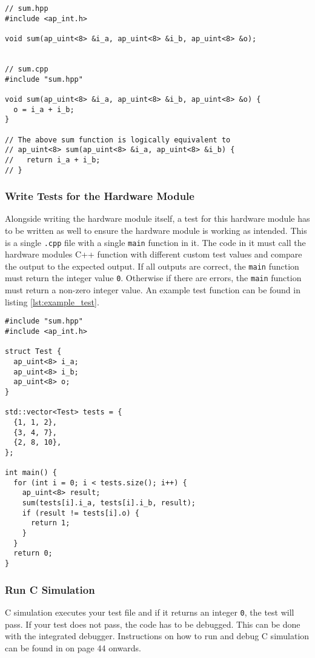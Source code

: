 \begin{lstlisting}[caption=Example Hardware Module,style=lststyle,label=lst:example_hardware_module]
// sum.hpp
#include <ap_int.h>

void sum(ap_uint<8> &i_a, ap_uint<8> &i_b, ap_uint<8> &o);


// sum.cpp
#include "sum.hpp"

void sum(ap_uint<8> &i_a, ap_uint<8> &i_b, ap_uint<8> &o) {
  o = i_a + i_b;
}

// The above sum function is logically equivalent to
// ap_uint<8> sum(ap_uint<8> &i_a, ap_uint<8> &i_b) {
//   return i_a + i_b;
// }
\end{lstlisting}

\subsubsection{Write Tests for the Hardware Module}
Alongside writing the hardware module itself, a test for this hardware module has to be written as well to ensure the hardware module is working as intended. This is a single \texttt{.cpp} file with a single \texttt{main} function in it. The code in it must call the hardware modules C++ function with different custom test values and compare the output to the expected output. If all outputs are correct, the \texttt{main} function must return the integer value \texttt{0}. Otherwise if there are errors, the \texttt{main} function must return a non-zero integer value. An example test function can be found in listing \ref{lst:example_test}.

\begin{lstlisting}[caption=Example Test,style=lststyle,label=lst:example_test]
#include "sum.hpp"
#include <ap_int.h>

struct Test {
  ap_uint<8> i_a;
  ap_uint<8> i_b;
  ap_uint<8> o;
}

std::vector<Test> tests = {
  {1, 1, 2},
  {3, 4, 7},
  {2, 8, 10},
};

int main() {
  for (int i = 0; i < tests.size(); i++) {
    ap_uint<8> result;
    sum(tests[i].i_a, tests[i].i_b, result);
    if (result != tests[i].o) {
      return 1;
    }
  }
  return 0;
}
\end{lstlisting}

\subsubsection{Run C Simulation}
C simulation executes your test file and if it returns an integer \texttt{0}, the test will pass. If your test does not pass, the code has to be debugged. This can be done with the integrated debugger. Instructions on how to run and debug C simulation can be found in \cite{xilinx:hls_tutorial} on page 44 onwards.

